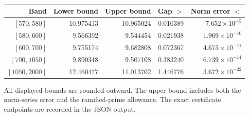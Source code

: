 \begin{center}
\small
\begin{tabular}{@{}rrrrr@{}}
\toprule
Band & Lower bound & Upper bound & Gap $>$ & Norm error $<$\\
\midrule
$[570,580]$ & 10.975413 & 10.965024 & 0.010389 & $7.652\times10^{-5}$\\
$[580,600]$ & 9.566392 & 9.544454 & 0.021938 & $1.969\times10^{-10}$\\
$[600,700]$ & 9.755174 & 9.682808 & 0.072367 & $4.675\times10^{-11}$\\
$[700,1050]$ & 9.890348 & 9.507108 & 0.383240 & $6.739\times10^{-14}$\\
$[1050,2000]$ & 12.460477 & 11.013702 & 1.446776 & $3.672\times10^{-22}$\\
\bottomrule
\end{tabular}
\end{center}
All displayed bounds are rounded outward. The upper bound includes
both the norm-series error and the ramified-prime allowance.
The exact certificate endpoints are recorded in the JSON output.
